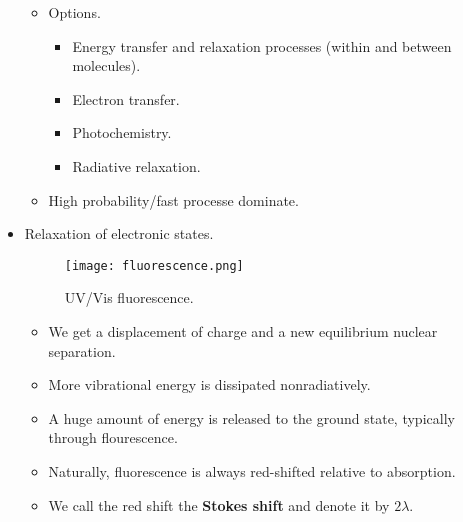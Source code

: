 \documentclass[../notes.tex]{subfiles}
\begin{document}
\begin{itemize}
\begin{itemize}
        \item Options.
        \begin{itemize}
            \item Energy transfer and relaxation processes (within and between molecules).
            \item Electron transfer.
            \item Photochemistry.
            \item Radiative relaxation.
        \end{itemize}
        \item High probability/fast processe dominate.
    \end{itemize}
    \item Relaxation of electronic states.
    \begin{figure}[h!]
        \centering
        \texttt{[image: fluorescence.png]}
        \caption{UV/Vis fluorescence.}
        \label{fig:fluorescence}
    \end{figure}
    \begin{itemize}
        \item We get a displacement of charge and a new equilibrium nuclear separation.
        \item More vibrational energy is dissipated nonradiatively.
        \item A huge amount of energy is released to the ground state, typically through flourescence.
        \item Naturally, fluorescence is always red-shifted relative to absorption.
        \item We call the red shift the \textbf{Stokes shift} and denote it by $2\lambda$.
    \end{itemize}
\end{itemize}
\end{document}
